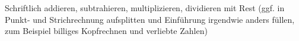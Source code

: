 \documentclass[../../main.tex]{subfiles}
\begin{document}
Schriftlich addieren, subtrahieren, multiplizieren, dividieren mit Rest (ggf. in Punkt- und Strichrechnung 
aufsplitten und Einführung irgendwie anders füllen, zum Beispiel billiges Kopfrechnen und verliebte Zahlen)
\end{document}
